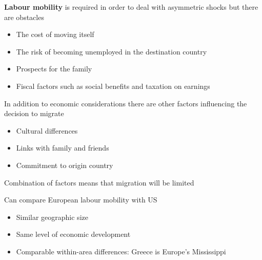 \documentclass{beamer}
\begin{document}
\begin{frame}
  \textbf{Labour mobility} is required in order to deal with asymmetric shocks but there are obstacles
  \medskip
\begin{itemize}
  \item The cost of moving itself
  \item The risk of becoming unemployed in the destination country
  \item Prospects for the family
  \item Fiscal factors such as social benefits and taxation on earnings
\end{itemize}
\end{frame}

\begin{frame}
  In addition to economic considerations there are other factors influencing the decision to migrate
  \begin{itemize}
    \item Cultural differences
    \item Links with family and friends
    \item Commitment to origin country
  \end{itemize}
  \medskip
  Combination of factors means that migration will be limited
\end{frame}


\begin{frame} 
  Can compare European labour mobility with US
  \begin{itemize}
    \item Similar geographic size
    \item Same level of economic development
    \item Comparable within-area differences: Greece is Europe's Mississippi
  \end{itemize}
\end{frame}
\end{document}
